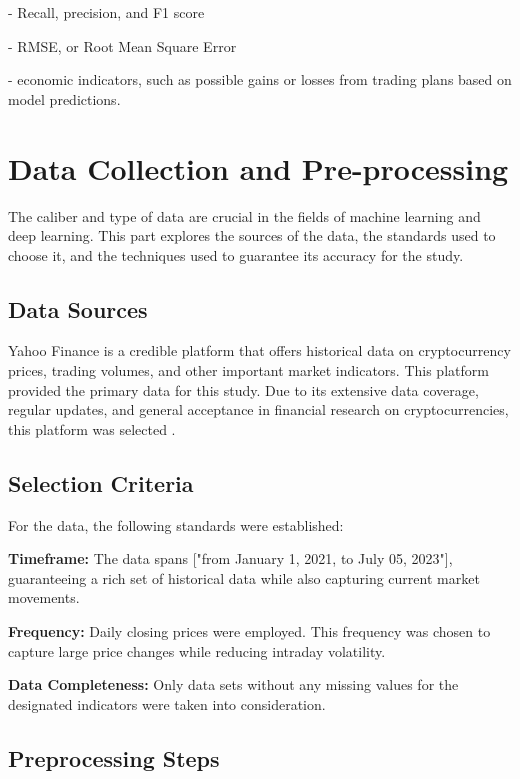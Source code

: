 -	Recall, precision, and F1 score

-	RMSE, or Root Mean Square Error

-	economic indicators, such as possible gains or losses from trading plans based on model predictions.

\medskip

\section{Data Collection and Pre-processing}

The caliber and type of data are crucial in the fields of machine learning and deep learning. This part explores the sources of the data, the standards used to choose it, and the techniques used to guarantee its accuracy for the study.

\subsection{Data Sources}

Yahoo Finance is a credible platform that offers historical data on cryptocurrency prices, trading volumes, and other important market indicators. This platform provided the primary data for this study. Due to its extensive data coverage, regular updates, and general acceptance in financial research on cryptocurrencies, this platform was selected \citep{smith2016predictive}.

\subsection{Selection Criteria}

For the data, the following standards were established:

\textbf{Timeframe:} The data spans ["from January 1, 2021, to July 05, 2023"], guaranteeing a rich set of historical data while also capturing current market movements.

\textbf{Frequency:} Daily closing prices were employed. This frequency was chosen to capture large price changes while reducing intraday volatility.

\textbf{Data Completeness:} Only data sets without any missing values for the designated indicators were taken into consideration.

\subsection{Preprocessing Steps}


